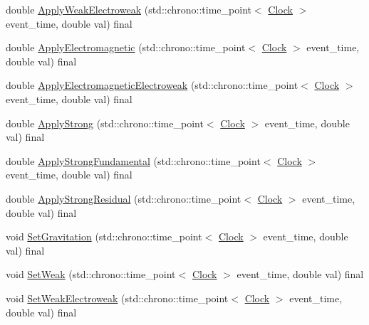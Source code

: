 \begin{DoxyCompactItemize}
\item 
double \mbox{\hyperlink{classSolid_ad6c28ec896cbcf64e24a7132a144befd}{Apply\+Weak\+Electroweak}} (std\+::chrono\+::time\+\_\+point$<$ \mbox{\hyperlink{universe_8h_a0ef8d951d1ca5ab3cfaf7ab4c7a6fd80}{Clock}} $>$ event\+\_\+time, double val) final
\item 
double \mbox{\hyperlink{classSolid_ab546d607d6f0bf70dc5e6bbac8baf287}{Apply\+Electromagnetic}} (std\+::chrono\+::time\+\_\+point$<$ \mbox{\hyperlink{universe_8h_a0ef8d951d1ca5ab3cfaf7ab4c7a6fd80}{Clock}} $>$ event\+\_\+time, double val) final
\item 
double \mbox{\hyperlink{classSolid_a46702e3109994b310eb4f1fba5610e0b}{Apply\+Electromagnetic\+Electroweak}} (std\+::chrono\+::time\+\_\+point$<$ \mbox{\hyperlink{universe_8h_a0ef8d951d1ca5ab3cfaf7ab4c7a6fd80}{Clock}} $>$ event\+\_\+time, double val) final
\item 
double \mbox{\hyperlink{classSolid_a0801ec0382bc509191575bcf9f5c83c1}{Apply\+Strong}} (std\+::chrono\+::time\+\_\+point$<$ \mbox{\hyperlink{universe_8h_a0ef8d951d1ca5ab3cfaf7ab4c7a6fd80}{Clock}} $>$ event\+\_\+time, double val) final
\item 
double \mbox{\hyperlink{classSolid_abd8fff76385306f97aa65dfd6b867fc6}{Apply\+Strong\+Fundamental}} (std\+::chrono\+::time\+\_\+point$<$ \mbox{\hyperlink{universe_8h_a0ef8d951d1ca5ab3cfaf7ab4c7a6fd80}{Clock}} $>$ event\+\_\+time, double val) final
\item 
double \mbox{\hyperlink{classSolid_a07534fa79bb8a6eb32e081e5158ba9e5}{Apply\+Strong\+Residual}} (std\+::chrono\+::time\+\_\+point$<$ \mbox{\hyperlink{universe_8h_a0ef8d951d1ca5ab3cfaf7ab4c7a6fd80}{Clock}} $>$ event\+\_\+time, double val) final
\item 
void \mbox{\hyperlink{classSolid_ae237f2c713868c133e28ed7f75fc9125}{Set\+Gravitation}} (std\+::chrono\+::time\+\_\+point$<$ \mbox{\hyperlink{universe_8h_a0ef8d951d1ca5ab3cfaf7ab4c7a6fd80}{Clock}} $>$ event\+\_\+time, double val) final
\item 
void \mbox{\hyperlink{classSolid_aa28e0f7e4de2fc0c1e28d385214296bf}{Set\+Weak}} (std\+::chrono\+::time\+\_\+point$<$ \mbox{\hyperlink{universe_8h_a0ef8d951d1ca5ab3cfaf7ab4c7a6fd80}{Clock}} $>$ event\+\_\+time, double val) final
\item 
void \mbox{\hyperlink{classSolid_adb34befc66f8c681f3a85c44e0d00e3a}{Set\+Weak\+Electroweak}} (std\+::chrono\+::time\+\_\+point$<$ \mbox{\hyperlink{universe_8h_a0ef8d951d1ca5ab3cfaf7ab4c7a6fd80}{Clock}} $>$ event\+\_\+time, double val) final
\item 

\end{DoxyCompactItemize}
